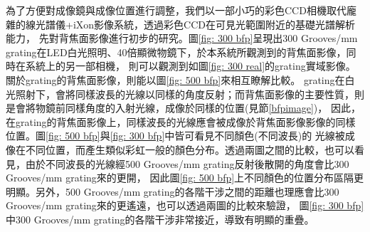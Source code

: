\documentclass[12pt]{article}
\begin{document}
為了方便對成像鏡與成像位置進行調整，我們以一部小巧的彩色CCD相機取代龐雜的線光譜儀+iXon影像系統，透過彩色CCD在可見光範圍附近的基礎光譜解析能力，
先對背焦面影像進行初步的研究。圖\ref{fig: 300 bfp}呈現出300 Grooves/mm grating在LED白光照明、40倍顯微物鏡下，於本系統所觀測到的背焦面影像，同時在系統上的另一部相機，
則可以觀測到如圖\ref{fig: 300 real}的grating實域影像。關於grating的背焦面影像，則能以圖\ref{fig: 500 bfp}來相互瞭解比較。
grating在白光照射下，會將同樣波長的光線以同樣的角度反射；而背焦面影像的主要性質，則是會將物鏡前同樣角度的入射光線，成像於同樣的位置(見節\ref{bfpimage})，
因此，在grating的背焦面影像上，同樣波長的光線應會被成像於背焦面影像影像的同樣位置。圖\ref{fig: 500 bfp}與\ref{fig: 300 bfp}中皆可看見不同顏色(不同波長)的
光線被成像在不同位置，而產生類似彩虹一般的顏色分布。透過兩圖之間的比較，也可以看見，由於不同波長的光線經500 Grooves/mm grating反射後散開的角度會比300 Grooves/mm grating來的更開，
因此圖\ref{fig: 500 bfp}上不同顏色的位置分布區隔更明顯。另外，500 Grooves/mm grating的各階干涉之間的距離也理應會比300 Grooves/mm grating來的更遙遠，也可以透過兩圖的比較來驗證，
圖\ref{fig: 300 bfp}中300 Grooves/mm grating的各階干涉非常接近，導致有明顯的重疊。
\end{document}
